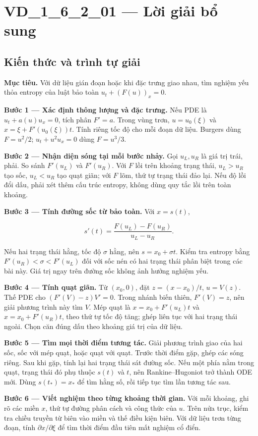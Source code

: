 \documentclass[10pt,a4paper]{article}
\begin{document}
\section*{VD\_1\_6\_2\_01 — Lời giải bổ sung}
\subsection*{Kiến thức và trình tự giải}
\textbf{Mục tiêu.} Với dữ liệu gián đoạn hoặc khi đặc trưng giao nhau, tìm nghiệm yếu thỏa entropy của luật bảo toàn $u_t+(F(u))_x=0$.

\textbf{Bước 1 — Xác định thông lượng và đặc trưng.} Nếu PDE là $u_t+a(u)u_x=0$, tích phân $F'=a$. Trong vùng trơn, $u=u_0(\xi)$ và $x=\xi+F'(u_0(\xi))t$. Tính riêng tốc độ cho mỗi đoạn dữ liệu. Burgers dùng $F=u^2/2$; $u_t+u^2u_x=0$ dùng $F=u^3/3$.

\textbf{Bước 2 — Nhận diện sóng tại mỗi bước nhảy.} Gọi $u_L,u_R$ là giá trị trái, phải. So sánh $F'(u_L)$ và $F'(u_R)$. Với $F$ lồi trên khoảng trạng thái, $u_L>u_R$ tạo sốc, $u_L<u_R$ tạo quạt giãn; với $F$ lõm, thứ tự trạng thái đảo lại. Nếu độ lồi đổi dấu, phải xét thêm cấu trúc entropy, không dùng quy tắc lồi trên toàn khoảng.

\textbf{Bước 3 — Tính đường sốc từ bảo toàn.} Với $x=s(t)$,

\[
s'(t)=\frac{F(u_L)-F(u_R)}{u_L-u_R}.
\]

Nếu hai trạng thái hằng, tốc độ $\sigma$ hằng, nên $s=x_0+\sigma t$. Kiểm tra entropy bằng $F'(u_R)<\sigma<F'(u_L)$ đối với sốc nén có hai trạng thái phân biệt trong các bài này. Giá trị ngay trên đường sốc không ảnh hưởng nghiệm yếu.

\textbf{Bước 4 — Tính quạt giãn.} Từ $(x_0,0)$, đặt $z=(x-x_0)/t$, $u=V(z)$. Thế PDE cho $(F'(V)-z)V'=0$. Trong nhánh biến thiên, $F'(V)=z$, nên giải phương trình này tìm $V$. Mép quạt là $x=x_0+F'(u_L)t$ và $x=x_0+F'(u_R)t$, theo thứ tự tốc độ tăng; ghép liên tục với hai trạng thái ngoài. Chọn căn đúng dấu theo khoảng giá trị của dữ liệu.

\textbf{Bước 5 — Tìm mọi thời điểm tương tác.} Giải phương trình giao của hai sốc, sốc với mép quạt, hoặc quạt với quạt. Trước thời điểm gặp, ghép các sóng riêng. Sau khi gặp, tính lại hai trạng thái sát đường sốc. Nếu một phía nằm trong quạt, trạng thái đó phụ thuộc $s(t)$ và $t$, nên Rankine–Hugoniot trở thành ODE mới. Dùng $s(t_*)=x_*$ để tìm hằng số, rồi tiếp tục tìm lần tương tác sau.

\textbf{Bước 6 — Viết nghiệm theo từng khoảng thời gian.} Với mỗi khoảng, ghi rõ các miền $x$, thứ tự đường phân cách và công thức của $u$. Trên nửa trục, kiểm tra chiều truyền từ biên vào miền và thế điều kiện biên. Với dữ liệu trơn từng đoạn, tính $\partial x/\partial\xi$ để tìm thời điểm đầu tiên mất nghiệm cổ điển.
\end{document}
